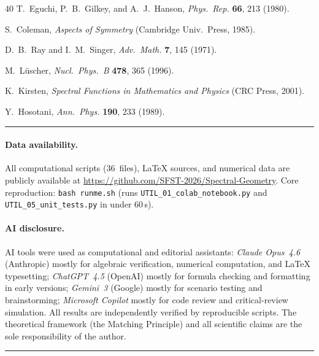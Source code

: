\documentclass[11pt,a4paper]{article}
\theoremstyle{definition}
\theoremstyle{remark}
\begin{document}
\begin{thebibliography}{40}
  T.~Eguchi, P.~B.~Gilkey, and A.~J.~Hanson,
  \emph{Phys.\ Rep.} \textbf{66}, 213 (1980).

  S.~Coleman, \emph{Aspects of Symmetry}
  (Cambridge Univ.\ Press, 1985).

  D.~B.~Ray and I.~M.~Singer, \emph{Adv.\ Math.} \textbf{7}, 145 (1971).

  M.~L\"uscher, \emph{Nucl.\ Phys.\ B} \textbf{478}, 365 (1996).

  K.~Kirsten, \emph{Spectral Functions in Mathematics and Physics}
  (CRC Press, 2001).

  Y.~Hosotani, \emph{Ann.\ Phys.} \textbf{190}, 233 (1989).

\end{thebibliography}

\bigskip
\noindent\rule{\textwidth}{0.4pt}
\paragraph{Data availability.}
All computational scripts (36~files), LaTeX sources, and
numerical data are publicly available at
\url{https://github.com/SFST-2026/Spectral-Geometry}.
Core reproduction: \texttt{bash runme.sh} (runs
\texttt{UTIL\_01\_colab\_notebook.py} and \texttt{UTIL\_05\_unit\_tests.py}
in under 60\,s).

\paragraph{AI disclosure.}
AI tools were used as computational and editorial assistants:
\emph{Claude Opus~4.6} (Anthropic) mostly for algebraic verification,
numerical computation, and \LaTeX{} typesetting;
\emph{ChatGPT~4.5} (OpenAI) mostly for formula checking and formatting in
early versions;
\emph{Gemini~3} (Google) mostly for scenario testing and brainstorming;
\emph{Microsoft Copilot} mostly for code review and critical-review simulation.
All results are independently verified by reproducible scripts.
The theoretical framework (the Matching Principle)
and all scientific claims are the sole responsibility of the author.
\noindent\rule{\textwidth}{0.4pt}

\appendix
\end{document}
